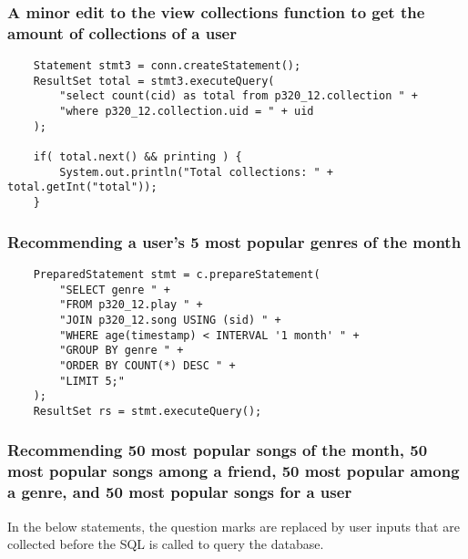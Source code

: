 \documentclass[12pt]{article}
\begin{document}
    \subsubsection{A minor edit to the view collections function to get the amount of collections of a user}

    \begin{lstlisting}
    Statement stmt3 = conn.createStatement();
    ResultSet total = stmt3.executeQuery(
        "select count(cid) as total from p320_12.collection " +
        "where p320_12.collection.uid = " + uid
    );

    if( total.next() && printing ) {
        System.out.println("Total collections: " + total.getInt("total"));
    }
    \end{lstlisting}

   \subsubsection{Recommending a user's 5 most popular genres of the month}

    \begin{lstlisting}
    PreparedStatement stmt = c.prepareStatement(
        "SELECT genre " +
        "FROM p320_12.play " +
        "JOIN p320_12.song USING (sid) " +
        "WHERE age(timestamp) < INTERVAL '1 month' " +
        "GROUP BY genre " +
        "ORDER BY COUNT(*) DESC " +
        "LIMIT 5;"
    );
    ResultSet rs = stmt.executeQuery();
    \end{lstlisting}


    \subsubsection{Recommending 50 most popular songs of the month, 50 most popular songs among a friend, 50 most popular among a genre, and 50 most popular songs for a user}

    \vspace{0.5cm}
    In the below statements, the question marks are replaced by user inputs that are collected
    before the SQL is called to query the database.
\end{document}
